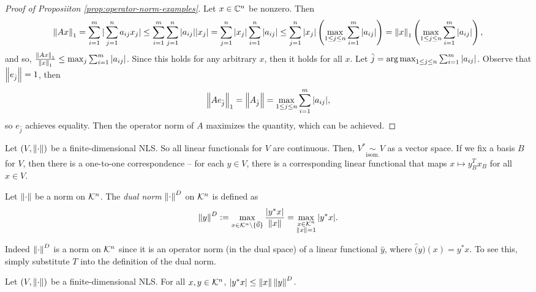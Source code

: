 \begin{proof}[Proof of Proposiiton \ref{prop:operator-norm-examples}]
Let $x \in \mathbb C^n$ be nonzero. Then
\[
    \left\lVert Ax\right\rVert_1 = \sum_{i=1}^m|\sum_{j=1}^n a_{ij}x_j| \leq \sum_{i=1}^m \sum_{j=1}^n |a_{ij}| |x_j| = \sum_{j=1}^n|x_j| \sum_{i=1}^n|a_{ij}| \leq \sum_{j=1}^n |x_j| \left(\max_{1 \leq j \leq n} \sum_{i=1}^m |a_{ij}|\right) = \left\lVert x\right\rVert_1 \left( \max_{1 \leq j \leq n} \sum_{i=1}^m |a_{ij}|\right),
\]
and so, $\frac{\left\lVert Ax\right\rVert_1}{\left\lVert x\right\rVert_1} \leq \max_j \sum_{i=1}^m |a_{ij}|$. Since this holds for any arbitrary $x$, then it holds for all $x$. Let $\hat{j} = \operatorname*{arg\,max}_{1 \leq j \leq n} \sum_{i=1}^m|a_{ij}|$. Observe that $\left\lVert e_{\hat{j}}\right\rVert = 1$, then
$$
\left\lVert Ae_{\hat{j}}\right\rVert_1 = \left\lVert A_{\hat{j}}\right\rVert = \max_{1 \leq j \leq n} \sum_{i=1}^m |a_{ij}|,
$$
so $e_{\hat{j}}$ achieves equality. Then the operator norm of $A$ maximizes the quantity, which can be achieved.
\end{proof}

\begin{note*} Let $(V, \left\lVert\cdot\right\rVert)$ be a finite-dimensional NLS. So all linear functionals for $V$ are continuous. Then, $V^* \underset{\text{isom.}}{\sim} V$ as a vector space. If we fix a basis $B$ for $V$, then there is a one-to-one correspondence -- for each $y \in V$, there is a corresponding linear functional that maps $x \mapsto y_B^T x_B$ for all $x \in V$.
\end{note*}

\begin{definition}
\label{def:dual-norm}
Let $\left\lVert\cdot\right\rVert$ be a norm on $\mathcal{K}^n$. The \textit{dual norm} $\left\lVert\cdot\right\rVert^D$ on $\mathcal{K}^n$ is defined as
$$
\left\lVert y\right\rVert^D \vcentcolon= \max_{x \in \mathcal{K}^n\setminus\{\Vec{0}\}} \frac{|y^*x|}{\left\lVert x\right\rVert} = \max_{\substack{x \in \mathcal{K}^n \\ \left\lVert x\right\rVert=1}} |y^*x|.
$$
\end{definition}

\begin{note*}
Indeed $\left\lVert\cdot\right\rVert^D$ is a norm on $\mathcal{K}^n$ since it is an operator norm (in the dual space) of a linear functional $\hat{y}$, where $\hat(y)(x) = y^*x$. To see this, simply substitute $T$ into the definition of the dual norm.
\end{note*}

\begin{lemma}
\label{lem:dual-norm-submultiplicativity}
Let $(V, \left\lVert\cdot\right\rVert)$ be a finite-dimensional NLS. For all $x,y \in \mathcal{K}^n$, $|y^*x| \leq \left\lVert x\right\rVert\left\lVert y\right\rVert^D$.
\end{lemma}

